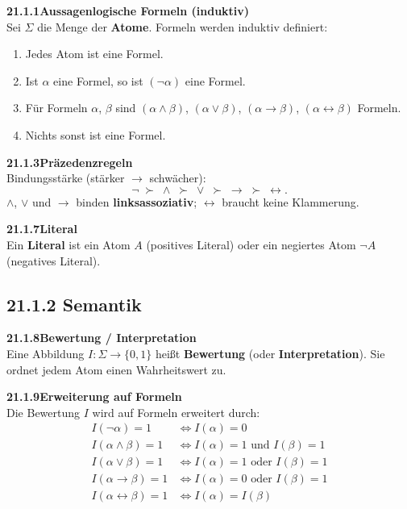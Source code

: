 \documentclass[a4paper,12pt]{article}
\newcommand{\gentry}[3]{%
  \noindent\textbf{#1\quad #2}\nopagebreak\\[0.2em]
  #3\par\smallskip
}
\begin{document}
\gentry{21.1.1}{Aussagenlogische Formeln (induktiv)}{%
  Sei $\Sigma$ die Menge der \textbf{Atome}. Formeln werden induktiv definiert:
  \begin{enumerate}[label=\arabic*.,topsep=2pt,itemsep=1pt]
    \item Jedes Atom ist eine Formel.
    \item Ist $\alpha$ eine Formel, so ist $(\lnot\alpha)$ eine Formel.
    \item Für Formeln $\alpha$, $\beta$ sind
          $(\alpha \land \beta)$, $(\alpha \lor \beta)$,
          $(\alpha \to \beta)$, $(\alpha \leftrightarrow \beta)$ Formeln.
    \item Nichts sonst ist eine Formel.
  \end{enumerate}
}

\gentry{21.1.3}{Präzedenzregeln}{%
  Bindungsstärke (stärker $\to$ schwächer):
  \[
    \lnot \;\succ\; \land \;\succ\; \lor \;\succ\; \to \;\succ\; \leftrightarrow.
  \]
  $\land$, $\lor$ und $\to$ binden \textbf{linksassoziativ};
  $\leftrightarrow$ braucht keine Klammerung.
}

\gentry{21.1.7}{Literal}{%
  Ein \textbf{Literal} ist ein Atom $A$ (positives Literal) oder ein negiertes
  Atom $\lnot A$ (negatives Literal).
}

\subsection*{21.1.2 Semantik}

\gentry{21.1.8}{Bewertung / Interpretation}{%
  Eine Abbildung $I : \Sigma \to \{0, 1\}$ heißt \textbf{Bewertung} (oder
  \textbf{Interpretation}). Sie ordnet jedem Atom einen Wahrheitswert zu.
}

\gentry{21.1.9}{Erweiterung auf Formeln}{%
  Die Bewertung $I$ wird auf Formeln erweitert durch:
  \[
  \begin{array}{ll}
    I(\lnot\alpha) = 1 & \Leftrightarrow I(\alpha) = 0 \\
    I(\alpha \land \beta) = 1 & \Leftrightarrow I(\alpha)=1 \text{ und } I(\beta)=1 \\
    I(\alpha \lor \beta) = 1 & \Leftrightarrow I(\alpha)=1 \text{ oder } I(\beta)=1 \\
    I(\alpha \to \beta) = 1 & \Leftrightarrow I(\alpha)=0 \text{ oder } I(\beta)=1 \\
    I(\alpha \leftrightarrow \beta) = 1 & \Leftrightarrow I(\alpha)=I(\beta)
  \end{array}
  \]
}
\end{document}
